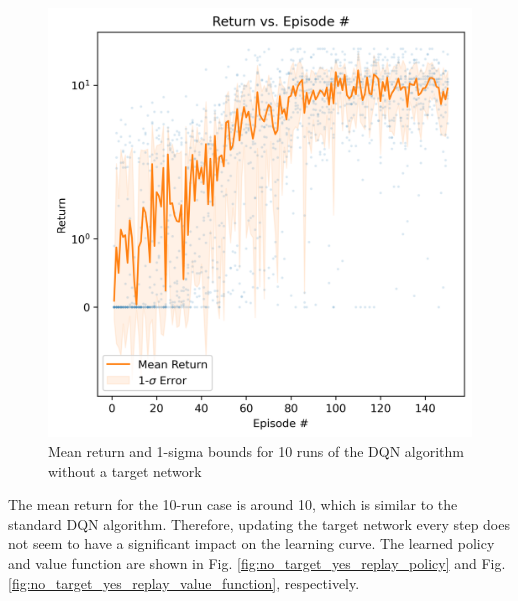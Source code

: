 \documentclass[conference]{IEEEtran}
\begin{document}
\begin{figure}[h]
\centering
\includegraphics[width=\linewidth]{../figures/no_target_yes_replay/mean_return_150_1_log_True.png}
\caption{Mean return and 1-sigma bounds for 10 runs of the DQN algorithm without a target network}
\label{fig:no_target_yes_replay_10_runs}
\end{figure}
The mean return for the 10-run case is around 10, which is similar to the standard DQN algorithm. Therefore, updating the target network every step does not seem to have a significant impact on the learning curve. The learned policy and value function are shown in Fig. \ref{fig:no_target_yes_replay_policy} and Fig. \ref{fig:no_target_yes_replay_value_function}, respectively.
\end{document}
